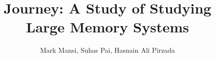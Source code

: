\documentclass[twocolumn,11pt]{article}
\title{Journey: A Study of Studying Large Memory Systems}
\author{Mark Mansi, Suhas Pai, Hasnain Ali Pirzada}
\date{}
\begin{document}
\maketitle

{}

\end{document}
